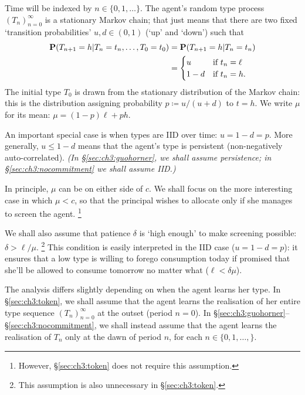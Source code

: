 Time will be indexed by $n \in \{0,1,\dots\}$.
The agent's random type process $( T_n )_{n=0}^\infty$ is a stationary Markov chain;
that just means that there are two fixed `transition probabilities' $u,d \in (0,1)$ (`up' and `down') such that
%
\begin{align*}
	\PP\left( T_{n+1} = h \middle|
	T_n = t_n, \dots,
	T_0 = t_0 \right)
	&= \PP\left( T_{n+1} = h \middle|
	T_n = t_n \right)
	\\
	&=
	\begin{cases}
		u		& \text{if $t_n = \ell$} \\
		1-d		& \text{if $t_n = h$.} 
	\end{cases}
\end{align*}
%
The initial type $T_0$ is drawn from the stationary distribution of the Markov chain: this is the distribution assigning probability $p \coloneqq u / (u+d)$ to $t=h$.
We write $\mu$ for its mean: $\mu = (1-p) \ell + p h$.

An important special case is when types are IID over time: $u=1-d=p$.
More generally, $u \leq 1-d$ means that the agent's type is persistent (non-negatively auto-correlated).
\emph{(In §\ref{sec:ch3:guohorner}, we shall assume persistence; in §\ref{sec:ch3:nocommitment} we shall assume IID.)}

In principle, $\mu$ can be on either side of $c$.
We shall focus on the more interesting case in which $\mu < c$, so that the principal wishes to allocate only if she manages to screen the agent.%
	\footnote{However, §\ref{sec:ch3:token} does not require this assumption.}

We shall also assume that patience $\delta$ is `high enough' to make screening possible: $\delta > \ell/\mu$.%
	\footnote{This assumption is also unnecessary in §\ref{sec:ch3:token}.}
This condition is easily interpreted in the IID case ($u=1-d=p$):
it ensures that a low type is willing to forego consumption today if promised that she'll be allowed to consume tomorrow no matter what ($\ell < \delta \mu$).

The analysis differs slightly depending on when the agent learns her type.
In §\ref{sec:ch3:token}, we shall assume that the agent learns the realisation of her entire type sequence $(T_n)_{n=0}^\infty$ at the outset (period $n=0$).
In §\ref{sec:ch3:guohorner}--§\ref{sec:ch3:nocommitment}, we shall instead assume that the agent learns the realisation of $T_n$ only at the dawn of period $n$, for each $n \in \{0,1,\dots,\}$.



